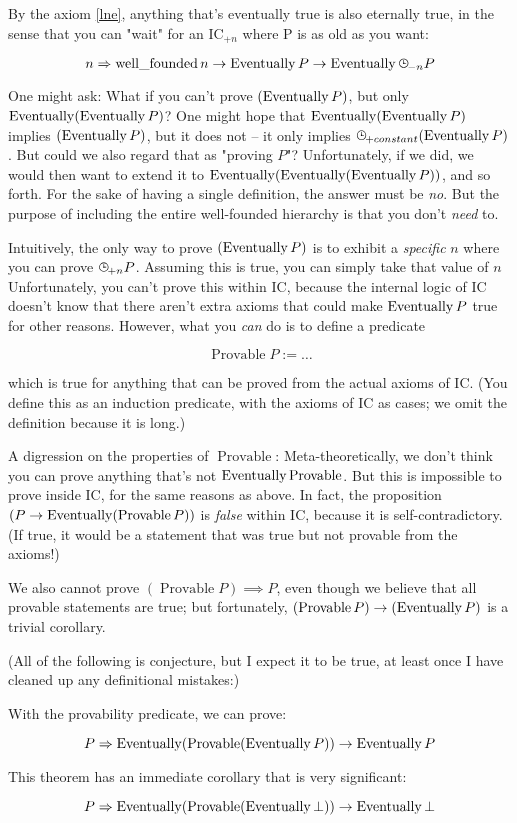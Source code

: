 \documentclass{article}
\begin{document}
  By the axiom \eqref{lne}, anything that's eventually true is also eternally true, in the sense that you can "wait" for an IC$_{+n}$ where P is as old as you want:
  
  \[ \nameabstraction{n} \wellfounded n \implies \eventually P \implies \eventually \clocksub{-n} P \]
  
  One might ask: What if you can't prove $(\operatorname{\mathrm{Eventually}} P)$, but only $\operatorname{\mathrm{Eventually}} (\operatorname{\mathrm{Eventually}} P)$? One might hope that $\operatorname{\mathrm{Eventually}} (\operatorname{\mathrm{Eventually}} P)$ implies $(\operatorname{\mathrm{Eventually}} P)$, but it does not – it only implies $\clocksub{+constant}(\eventually P)$. But could we also regard that as "proving $P$"? Unfortunately, if we did, we would then want to extend it to $\operatorname{\mathrm{Eventually}} (\operatorname{\mathrm{Eventually}} (\operatorname{\mathrm{Eventually}} P))$, and so forth. For the sake of having a single definition, the answer must be \emph{no}. But the purpose of including the entire well-founded hierarchy is that you don't \emph{need} to.
  
  Intuitively, the only way to prove $(\operatorname{\mathrm{Eventually}} P)$ is to exhibit a \emph{specific} $n$ where you can prove $\clocksub{+n} P$. Assuming this is true, you can simply take that value of $n$ Unfortunately, you can't prove this within IC, because the internal logic of IC doesn't know that there aren't extra axioms that could make $\operatorname{\mathrm{Eventually}} P$ true for other reasons. However, what you \emph{can} do is to define a predicate
  
  \newcommand{\provable}{\operatorname{\mathrm{Provable}}}
  
  \[\provable P := \dots\]
  
  which is true for anything that can be proved from the actual axioms of IC. (You define this as an induction predicate, with the axioms of IC as cases; we omit the definition because it is long.)
  
  A digression on the properties of $\provable$: Meta-theoretically, we don't think you can prove anything that's not $\eventually \provable$. But this is impossible to prove inside IC, for the same reasons as above. In fact, the proposition $(P \implies \eventually (\provable P))$ is \emph{false} within IC, because it is self-contradictory. (If true, it would be a statement that was true but not provable from the axioms!)
  
  We also cannot prove $(\provable P) \implies P$, even though we believe that all provable statements are true; but fortunately, $(\provable P) \implies (\eventually P)$ is a trivial corollary.
  
  (All of the following is conjecture, but I expect it to be true, at least once I have cleaned up any definitional mistakes:)
  
  With the provability predicate, we can prove:
  
  \[ \nameabstraction{P} \eventually (\provable (\eventually P)) \implies \eventually  P \]
  
  This theorem has an immediate corollary that is very significant:
  
  \[ \nameabstraction{P} \eventually (\provable (\eventually \bot)) \implies \eventually \bot \]
  

\end{document}
